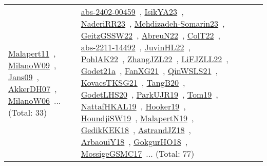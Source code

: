 {\begin{longtable}{lp{3cm}>{\raggedright\arraybackslash}p{6cm}>{\raggedright\arraybackslash}p{6cm}>{\raggedright\arraybackslash}p{8cm}}
\href{works/Malapert11.pdf}{Malapert11}~\cite{Malapert11}, \href{works/MilanoW09.pdf}{MilanoW09}~\cite{MilanoW09}, \href{works/Jans09.pdf}{Jans09}~\cite{Jans09}, \href{works/AkkerDH07.pdf}{AkkerDH07}~\cite{AkkerDH07}, \href{works/MilanoW06.pdf}{MilanoW06}~\cite{MilanoW06}... (Total: 33) & \href{works/abs-2402-00459.pdf}{abs-2402-00459}~\cite{abs-2402-00459}, \href{works/IsikYA23.pdf}{IsikYA23}~\cite{IsikYA23}, \href{works/NaderiRR23.pdf}{NaderiRR23}~\cite{NaderiRR23}, \href{works/Mehdizadeh-Somarin23.pdf}{Mehdizadeh-Somarin23}~\cite{Mehdizadeh-Somarin23}, \href{works/GeitzGSSW22.pdf}{GeitzGSSW22}~\cite{GeitzGSSW22}, \href{works/AbreuN22.pdf}{AbreuN22}~\cite{AbreuN22}, \href{works/ColT22.pdf}{ColT22}~\cite{ColT22}, \href{works/abs-2211-14492.pdf}{abs-2211-14492}~\cite{abs-2211-14492}, \href{works/JuvinHL22.pdf}{JuvinHL22}~\cite{JuvinHL22}, \href{works/PohlAK22.pdf}{PohlAK22}~\cite{PohlAK22}, \href{works/ZhangJZL22.pdf}{ZhangJZL22}~\cite{ZhangJZL22}, \href{works/LiFJZLL22.pdf}{LiFJZLL22}~\cite{LiFJZLL22}, \href{works/Godet21a.pdf}{Godet21a}~\cite{Godet21a}, \href{works/FanXG21.pdf}{FanXG21}~\cite{FanXG21}, \href{works/QinWSLS21.pdf}{QinWSLS21}~\cite{QinWSLS21}, \href{works/KovacsTKSG21.pdf}{KovacsTKSG21}~\cite{KovacsTKSG21}, \href{works/TangB20.pdf}{TangB20}~\cite{TangB20}, \href{works/GodetLHS20.pdf}{GodetLHS20}~\cite{GodetLHS20}, \href{works/ParkUJR19.pdf}{ParkUJR19}~\cite{ParkUJR19}, \href{works/Tom19.pdf}{Tom19}~\cite{Tom19}, \href{works/NattafHKAL19.pdf}{NattafHKAL19}~\cite{NattafHKAL19}, \href{works/Hooker19.pdf}{Hooker19}~\cite{Hooker19}, \href{works/HoundjiSW19.pdf}{HoundjiSW19}~\cite{HoundjiSW19}, \href{works/MalapertN19.pdf}{MalapertN19}~\cite{MalapertN19}, \href{works/GedikKEK18.pdf}{GedikKEK18}~\cite{GedikKEK18}, \href{works/AstrandJZ18.pdf}{AstrandJZ18}~\cite{AstrandJZ18}, \href{works/ArbaouiY18.pdf}{ArbaouiY18}~\cite{ArbaouiY18}, \href{works/GokgurHO18.pdf}{GokgurHO18}~\cite{GokgurHO18}, \href{works/MossigeGSMC17.pdf}{MossigeGSMC17}~\cite{MossigeGSMC17}... (Total: 77)\\
\end{longtable}
}


